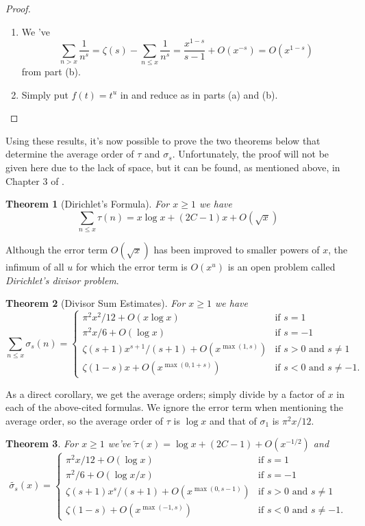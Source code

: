 \documentclass[9pt]{report}
\newtheorem{theorem}{Theorem}
\theoremstyle{definition}
\begin{document}
\begin{proof}
\begin{enumerate}
        \item We 've
            \[\sum_{n>x} \frac{1}{n^s} = \zeta(s) - \sum_{n\le x} \frac{1}{n^s} = \frac{x^{1-s}}{s-1} + O(x^{-s}) = O(x^{1-s})\]
            from part (b).

        \item Simply put \(f(t) = t^u\) in  and reduce as in parts (a) and (b).
    \end{enumerate}
\end{proof}

Using these results, it's now possible to prove the two theorems below that determine the average order of \(\tau\) and \(\sigma_s\).
Unfortunately, the proof will not be given here due to the lack of space, but it can be found, as mentioned above, in Chapter 3 of \cite{Apostol1976}.

\begin{theorem}[Dirichlet's Formula]\label{theorem:tau}
    For \(x\ge 1\) we have
    \[\sum_{n\le x} \tau(n) = x\log x + (2C-1)x + O(\sqrt x)\]
\end{theorem}

Although the error term \(O(\sqrt x)\) has been improved to smaller powers of \(x\), the infimum of all \(u\) for which the error term is \(O(x^u)\) is an open problem called \textit{Dirichlet's divisor problem}.

\begin{theorem}[Divisor Sum Estimates]\label{theorem:sigma}
    For \(x\ge 1\) we have
    \[
        \sum_{n\le x} \sigma_s(n) =
        \begin{cases}
            \pi^2x^2/12 + O(x\log x) & \text{if } s=1 \\
            \pi^2x/6 + O(\log x) & \text{if } s=-1 \\
            \zeta(s+1)x^{s+1}/(s+1) + O(x^{\max(1,s)}) & \text{if } s>0 \text{ and } s\ne 1 \\
            \zeta(1-s)x + O(x^{\max(0,1+s)}) & \text{if } s<0 \text{ and } s\ne -1.
        \end{cases}
    \]
\end{theorem}

As a direct corollary, we get the average orders; simply divide by a factor of \(x\) in each of the above-cited formulas.
We ignore the error term when mentioning the average order, so the average order of \(\tau\) is \(\log x\) and that of \(\sigma_1\) is \(\pi^2x/12\).

\begin{theorem}
    For \(x\ge 1\) we've \(\tilde{\tau}(x) = \log x + (2C-1) + O(x^{-1/2})\) and
    \[
        \tilde{\sigma_s}(x) =
        \begin{cases}
            \pi^2x/12 + O(\log x) & \text{if } s=1 \\
            \pi^2/6 + O(\log x/x) & \text{if } s=-1 \\
            \zeta(s+1)x^s/(s+1) + O(x^{\max(0,s-1)}) & \text{if } s>0 \text{ and } s\ne 1 \\
            \zeta(1-s) + O(x^{\max(-1,s)}) & \text{if } s<0 \text{ and } s\ne -1.
        \end{cases}
    \]
\end{theorem}
\end{document}
